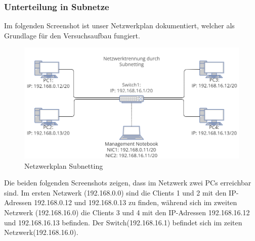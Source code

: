         \subsubsection{Unterteilung in Subnetze}
        Im folgenden Screenshot ist unser Netzwerkplan dokumentiert, welcher als Grundlage für
        den Versuchsaufbau fungiert.
        \begin{figure}[H]
            \centering
            \includegraphics[scale=0.5]{images/Unterteilung in Subnetze/Netzwerkplan_Subnetting_new.png}
            \caption{Netzwerkplan Subnetting}
        \end{figure}
        Die beiden folgenden Screenshots zeigen, dass im Netzwerk zwei PCs erreichbar sind. Im ersten Netzwerk (192.168.0.0) 
        sind die Clients 1 und 2 mit den IP-Adressen 192.168.0.12 und 192.168.0.13 zu finden, während sich im zweiten Netzwerk 
        (192.168.16.0) die Clients 3 und 4 mit den IP-Adressen 192.168.16.12 und 192.168.16.13 befinden. Der Switch(192.168.16.1)
        befindet sich im zeiten Netzwerk(192.168.16.0).
